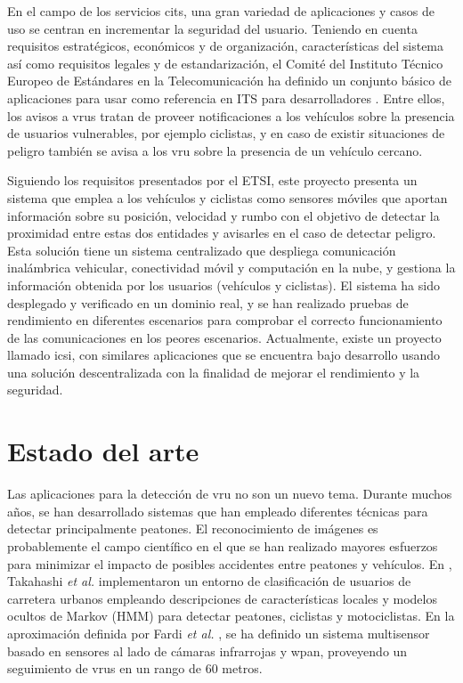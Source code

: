 En el campo de los servicios \gls{cits}, una gran variedad de aplicaciones y
casos de uso se centran en incrementar la seguridad del usuario. Teniendo en
cuenta requisitos estratégicos, económicos y de organización, características
del sistema así como requisitos legales y de estandarización, el Comité del
Instituto Técnico Europeo de Estándares en la Telecomunicación ha definido un
conjunto básico de aplicaciones para usar como referencia en ITS para
desarrolladores \cite{5}. Entre ellos, los avisos a \gls{vru}s tratan de
proveer notificaciones a los vehículos sobre la presencia de usuarios
vulnerables, por ejemplo ciclistas, y en caso de existir situaciones de peligro
también se avisa a los \gls{vru} sobre la presencia de un vehículo cercano.

Siguiendo los requisitos presentados por el ETSI, este proyecto presenta un
sistema que emplea a los vehículos y ciclistas como sensores móviles que
aportan información sobre su posición, velocidad y rumbo con el objetivo de
detectar la proximidad entre estas dos entidades y avisarles en el caso de
detectar peligro. Esta solución tiene un sistema centralizado que despliega
comunicación inalámbrica vehicular, conectividad móvil y computación en la
nube, y gestiona la información obtenida por los usuarios (vehículos y
ciclistas). El sistema ha sido desplegado y verificado en un dominio real, y
se han realizado pruebas de rendimiento en diferentes escenarios para comprobar
el correcto funcionamiento de las comunicaciones en los peores escenarios.
Actualmente, existe un proyecto llamado \gls{icsi}, con similares aplicaciones
que se encuentra bajo desarrollo usando una solución descentralizada con la
finalidad de mejorar el rendimiento y la seguridad.

\section{Estado del arte}\label{section:antecedentes}
Las aplicaciones para la detección de \gls{vru} no son un nuevo tema. Durante
muchos años, se han desarrollado sistemas que han empleado diferentes técnicas
para detectar principalmente peatones. El reconocimiento de imágenes es
probablemente el campo científico en el que se han realizado mayores esfuerzos
para minimizar el impacto de posibles accidentes entre peatones y vehículos.
En \cite{6}, Takahashi \emph{et al.} implementaron un entorno de clasificación
de usuarios de carretera urbanos empleando descripciones de características
locales y modelos ocultos de Markov (HMM) para detectar peatones, ciclistas y
motociclistas. En la aproximación definida por Fardi \emph{et al.} \cite{7},
se ha definido un sistema multisensor basado en sensores al lado de cámaras
infrarrojas y \gls{wpan}, proveyendo un seguimiento de \gls{vru}s en un rango
de 60 metros.

